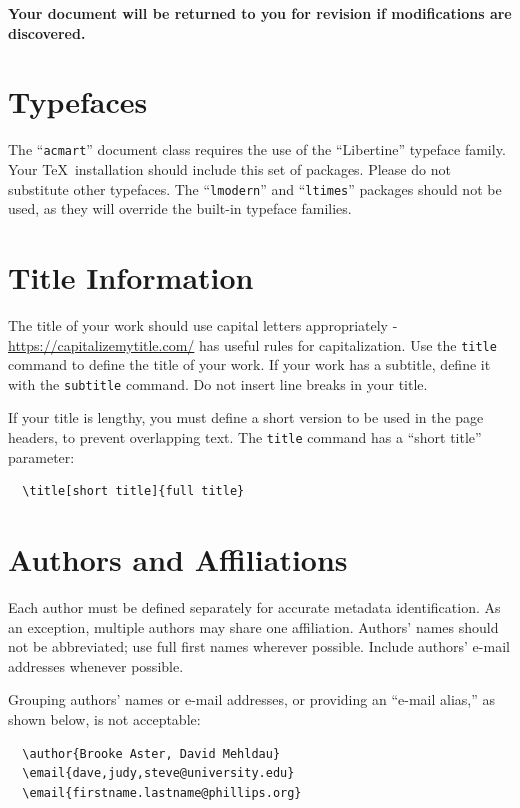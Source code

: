 \documentclass[sigconf, review]{acmart}
\begin{document}
{\bfseries Your document will be returned to you for revision if
  modifications are discovered.}

\section{Typefaces}

The ``\verb|acmart|'' document class requires the use of the
``Libertine'' typeface family. Your \TeX\ installation should include
this set of packages. Please do not substitute other typefaces. The
``\verb|lmodern|'' and ``\verb|ltimes|'' packages should not be used,
as they will override the built-in typeface families.

\section{Title Information}

The title of your work should use capital letters appropriately -
\url{https://capitalizemytitle.com/} has useful rules for
capitalization. Use the {\verb|title|} command to define the title of
your work. If your work has a subtitle, define it with the
{\verb|subtitle|} command.  Do not insert line breaks in your title.

If your title is lengthy, you must define a short version to be used
in the page headers, to prevent overlapping text. The \verb|title|
command has a ``short title'' parameter:
\begin{verbatim}
  \title[short title]{full title}
\end{verbatim}

\section{Authors and Affiliations}

Each author must be defined separately for accurate metadata
identification.  As an exception, multiple authors may share one
affiliation. Authors' names should not be abbreviated; use full first
names wherever possible. Include authors' e-mail addresses whenever
possible.

Grouping authors' names or e-mail addresses, or providing an ``e-mail
alias,'' as shown below, is not acceptable:
\begin{verbatim}
  \author{Brooke Aster, David Mehldau}
  \email{dave,judy,steve@university.edu}
  \email{firstname.lastname@phillips.org}
\end{verbatim}
\end{document}
